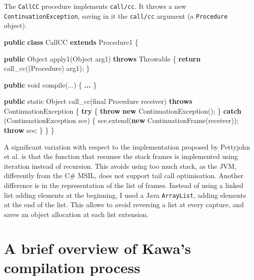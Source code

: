 \documentclass[12pt,a4paper,oneside,openright]{book}
\newenvironment{Shaded}{\begin{snugshade}}{\end{snugshade}}
\newcommand{\KeywordTok}[1]{\textcolor[rgb]{0.13,0.29,0.53}{\textbf{{#1}}}}
\newcommand{\DataTypeTok}[1]{\textcolor[rgb]{0.13,0.29,0.53}{{#1}}}
\newcommand{\FunctionTok}[1]{\textcolor[rgb]{0.00,0.00,0.00}{{#1}}}
\newcommand{\NormalTok}[1]{{#1}}
\begin{document}
The \texttt{CallCC} procedure implements \texttt{call/cc}. It throws a
new \texttt{ContinuationException}, saving in it the \texttt{call/cc}
argument (a \texttt{Procedure} object).

\begin{Shaded}
\begin{Highlighting}[]
\KeywordTok{public} \KeywordTok{class} \NormalTok{CallCC }\KeywordTok{extends} \NormalTok{Procedure1 \{}

    \KeywordTok{public} \NormalTok{Object }\FunctionTok{apply1}\NormalTok{(Object arg1) }\KeywordTok{throws} \NormalTok{Throwable \{}
        \KeywordTok{return} \FunctionTok{call_cc}\NormalTok{((Procedure) arg1);}
    \NormalTok{\}}

    \KeywordTok{public} \DataTypeTok{void} \FunctionTok{compile}\NormalTok{(...) \{ }\KeywordTok{... }\NormalTok{\}}

    \KeywordTok{public} \DataTypeTok{static} \NormalTok{Object }\FunctionTok{call_cc}\NormalTok{(}\DataTypeTok{final} \NormalTok{Procedure receiver)}
    \KeywordTok{throws} \NormalTok{ContinuationException \{}
        \KeywordTok{try} \NormalTok{\{}
            \KeywordTok{throw} \KeywordTok{new} \FunctionTok{ContinuationException}\NormalTok{();}
        \NormalTok{\} }\KeywordTok{catch} \NormalTok{(ContinuationException sce) \{}
            \NormalTok{sce.}\FunctionTok{extend}\NormalTok{(}\KeywordTok{new} \FunctionTok{ContinuationFrame}\NormalTok{(receiver));}
            \KeywordTok{throw} \NormalTok{sce;}
        \NormalTok{\}}
    \NormalTok{\}}
\NormalTok{\}}
\end{Highlighting}
\end{Shaded}

A significant variation with respect to the implementation proposed by
Pettyjohn et al. is that the function that resumes the stack frames is
implemented using iteration instead of recursion. This avoids using too
much stack, as the JVM, differently from the C\# MSIL, does not support
tail call optimisation. Another difference is in the representation of
the list of frames. Instead of using a linked list adding elements at
the beginning, I used a Java \texttt{ArrayList}, adding elements at the
end of the list. This allows to avoid reversing a list at every capture,
and saves an object allocation at each list extension.

\newpage

\section{A brief overview of Kawa's compilation
process}\label{a-brief-overview-of-kawas-compilation-process}
\end{document}
